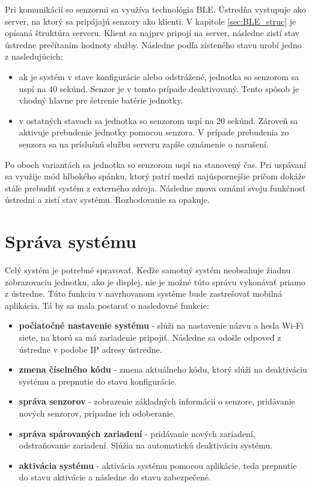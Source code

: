 Pri komunikácií so senzormi sa využíva technológia BLE. Ústredňa vystupuje ako server, na ktorý sa pripájajú senzory ako klienti. V kapitole \ref{sec:BLE_struc} je opísaná štruktúra serveru. Klient sa najprv pripojí na server, následne zistí stav ústredne prečítaním hodnoty služby. Následne podľa zisteného stavu urobí jedno z nasledujúcich:
\begin{itemize}
    \item ak je systém v stave konfigurácie alebo odstrážené, jednotka so senzorom sa uspí na 40 sekúnd. Senzor je v tomto prípade deaktivovaný. Tento spôsob je vhodný hlavne pre šetrenie batérie jednotky.
    \item v ostatných stavoch sa jednotka so senzorom uspí na 20 sekúnd. Zároveň sa aktivuje prebudenie jednotky pomocou senzora. V prípade prebudenia zo senzora sa na príslušnú službu serveru zapíše oznámenie o narušení.
\end{itemize}
Po oboch variantách sa jednotka so senzorom uspí na stanovený čas. Pri uspávaní sa využije mód hlbokého spánku, ktorý patrí medzi najúspornejšie pričom dokáže stále prebudiť systém z externého zdroja. Následne znova oznámi svoju funkčnosť ústredni a zistí stav systému. Rozhodovanie sa opakuje.

\section{Správa systému}

Celý systém je potrebné spravovať. Keďže samotný systém neobsahuje žiadnu zobrazovaciu jednotku, ako je displej, nie je možné túto správu vykonávať priamo z ústredne. Túto funkciu v navrhovanom systéme bude zastrešovať mobilná aplikácia. Tá by sa mala postarať o nasledovné funkcie:
\begin{itemize}
    \item \textbf{počiatočné nastavenie systému} - slúži na nastavenie názvu a hesla Wi-Fi siete, na ktorú sa má zariadenie pripojiť. Následne sa odošle odpoveď z ústredne v podobe IP adresy ústredne.
    \item \textbf{zmena číselného kódu} - zmena aktuálneho kódu, ktorý slúži na deaktiváciu systému a prepnutie do stavu konfigurácie.
    \item \textbf{správa senzorov} - zobrazenie základných informácií o senzore, pridávanie nových senzorov, prípadne ich odoberanie.
    \item \textbf{správa spárovaných zariadení} - pridávanie nových zariadení, odstraňovanie zariadení. Slúžia na automatickú deaktiváciu systému.
    \item \textbf{aktivácia systému} - aktivácia systému pomocou aplikácie, teda prepnutie do stavu aktivácie a následne do stavu zabezpečené.
\end{itemize}

